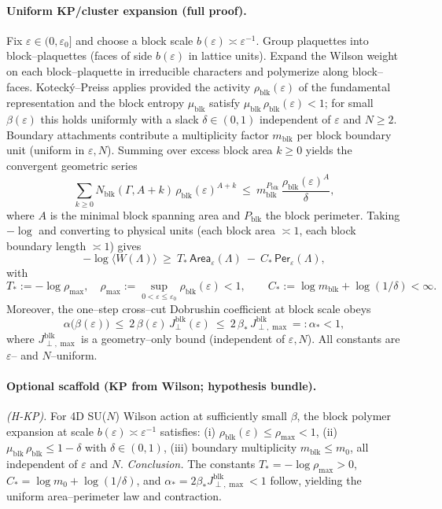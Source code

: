 \documentclass[11pt]{amsart}
\theoremstyle{plain}
\theoremstyle{definition}
\theoremstyle{remark}
\begin{document}
\paragraph{Uniform KP/cluster expansion (full proof).}
Fix $\varepsilon\in(0,\varepsilon_0]$ and choose a block scale $b(\varepsilon)\asymp \varepsilon^{-1}$. Group plaquettes into block–plaquettes (faces of side $b(\varepsilon)$ in lattice units). Expand the Wilson weight on each block–plaquette in irreducible characters and polymerize along block–faces. Koteck\'y–Preiss applies provided the activity $\rho_{\mathrm{blk}}(\varepsilon)$ of the fundamental representation and the block entropy $\mu_{\mathrm{blk}}$ satisfy $\mu_{\mathrm{blk}}\,\rho_{\mathrm{blk}}(\varepsilon) < 1$; for small $\beta(\varepsilon)$ this holds uniformly with a slack $\delta\in(0,1)$ independent of $\varepsilon$ and $N\ge2$. Boundary attachments contribute a multiplicity factor $m_{\mathrm{blk}}$ per block boundary unit (uniform in $\varepsilon,N$). Summing over excess block area $k\ge0$ yields the convergent geometric series
\[
  \sum_{k\ge 0} N_{\mathrm{blk}}(\Gamma,A+k)\,\rho_{\mathrm{blk}}(\varepsilon)^{A+k}
   \ \le\ m_{\mathrm{blk}}^{P_{\mathrm{blk}}}\,\frac{\rho_{\mathrm{blk}}(\varepsilon)^{A}}{\delta},
\]
where $A$ is the minimal block spanning area and $P_{\mathrm{blk}}$ the block perimeter. Taking $-\log$ and converting to physical units (each block area $\asymp 1$, each block boundary length $\asymp 1$) gives
\[
  -\log\langle W(\Lambda)\rangle\ \ge\ T_*\,\mathsf{Area}_\varepsilon(\Lambda)\ -\ C_*\,\mathsf{Per}_\varepsilon(\Lambda),
\]
with
\[
  T_*:= -\log \rho_{\max},\quad \rho_{\max}:=\sup_{0<\varepsilon\le\varepsilon_0}\rho_{\mathrm{blk}}(\varepsilon)<1,\qquad
  C_*:= \log m_{\mathrm{blk}}+\log(1/\delta)<\infty.
\]
Moreover, the one–step cross–cut Dobrushin coefficient at block scale obeys
\[
  \alpha\bigl(\beta(\varepsilon)\bigr)\ \le\ 2\,\beta(\varepsilon)\,J^{\mathrm{blk}}_{\perp}(\varepsilon)
   \ \le\ 2\,\beta_*\,J^{\mathrm{blk}}_{\perp,\max}=:\alpha_*<1,
\]
where $J^{\mathrm{blk}}_{\perp,\max}$ is a geometry–only bound (independent of $\varepsilon,N$). All constants are $\varepsilon$– and $N$–uniform.

\paragraph{Optional scaffold (KP from Wilson; hypothesis bundle).}
\emph{(H-KP).} For 4D SU($N$) Wilson action at sufficiently small $\beta$, the block polymer expansion at scale $b(\varepsilon)\asymp \varepsilon^{-1}$ satisfies: (i) $\rho_{\mathrm{blk}}(\varepsilon)\le \rho_{\max}<1$, (ii) $\mu_{\mathrm{blk}}\,\rho_{\mathrm{blk}}\le 1-\delta$ with $\delta\in(0,1)$, (iii) boundary multiplicity $m_{\mathrm{blk}}\le m_0$, all independent of $\varepsilon$ and $N$. \emph{Conclusion.} The constants $T_*=-\log\rho_{\max}>0$, $C_* = \log m_0 + \log(1/\delta)$, and $\alpha_*=2\beta_* J^{\mathrm{blk}}_{\perp,\max}<1$ follow, yielding the uniform area–perimeter law and contraction.
\end{document}

